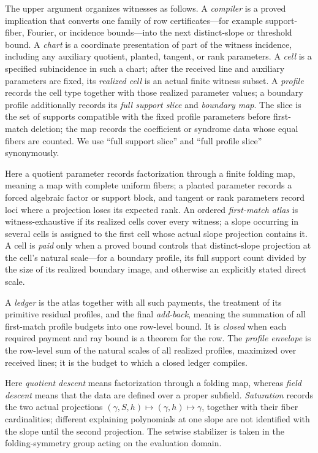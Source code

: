 \documentclass[12pt,a4paper]{amsart}
\numberwithin{equation}{section}
\theoremstyle{remark}
\begin{document}
The upper argument organizes witnesses as follows.  A \emph{compiler} is
a proved implication that converts one family of row certificates---for
example support-fiber, Fourier, or incidence bounds---into the next
distinct-slope or threshold bound.  A \emph{chart} is a
coordinate presentation of part of the witness incidence, including any
auxiliary quotient, planted, tangent, or rank parameters.  A \emph{cell}
is a specified subincidence in such a chart; after the received line and
auxiliary parameters are fixed, its \emph{realized cell} is an actual
finite witness subset.  A \emph{profile} records the cell type together
with those realized parameter values; a boundary profile additionally
records its \emph{full support slice} and \emph{boundary map}.  The slice
is the set of supports compatible with the fixed profile parameters before
first-match deletion; the map records the coefficient or syndrome data
whose equal fibers are counted.  We use ``full support slice'' and ``full
profile slice'' synonymously.

Here a quotient parameter records factorization through a finite folding
map, meaning a map with complete uniform fibers; a
planted parameter records a forced algebraic factor or support block, and
tangent or rank parameters record loci where a projection loses its
expected rank.  An ordered
\emph{first-match atlas} is witness-exhaustive if its realized cells cover
every witness; a slope occurring in several cells is assigned to the first
cell whose actual slope projection contains it.  A cell is \emph{paid}
only when a proved bound controls that distinct-slope projection at the
cell's natural scale---for a boundary profile, its full support count
divided by the size of its realized boundary image, and otherwise an
explicitly stated direct scale.

A \emph{ledger} is the atlas together with all such
payments, the treatment of its primitive residual profiles, and the final
\emph{add-back}, meaning the summation of all first-match profile budgets
into one row-level bound.  It is \emph{closed} when each required payment and ray bound is
a theorem for the row.  The \emph{profile envelope} is the row-level sum
of the natural scales of all realized profiles, maximized over received
lines; it is the budget to which a closed ledger compiles.

Here \emph{quotient descent} means factorization through a folding map,
whereas \emph{field descent} means that the data are defined over a proper
subfield.  \emph{Saturation} records the two actual projections
\((\gamma,S,h)\mapsto(\gamma,h)\mapsto\gamma\), together with their
fiber cardinalities; different explaining polynomials at one slope are not
identified with the slope until the second projection.  The setwise
stabilizer is taken in the folding-symmetry group acting on the evaluation
domain.
\end{document}
